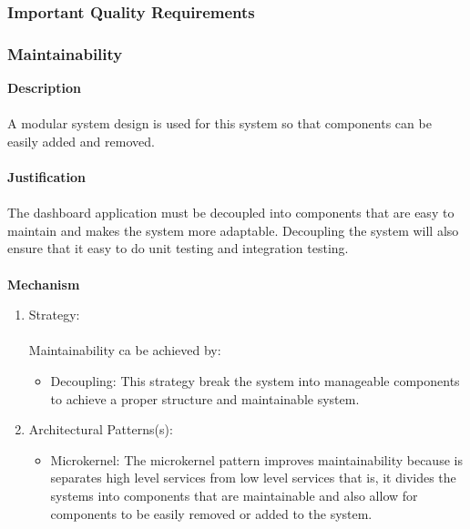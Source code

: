 \documentclass[hidelinks, 12pt, oneside]{article}
\begin{document}
		\subsubsection{Important Quality Requirements}
			\subsubsection*{Maintainability}
			\textbf{Description}\\\\
			A modular system design is used for this system so that components can be easily added and removed.\\\\
			\textbf{Justification}\\\\
			The dashboard application must be decoupled into components that are easy to maintain and makes the system more adaptable. Decoupling the system will also ensure that it easy to do unit testing and integration testing.\\\\
			\textbf{Mechanism}
			\begin{enumerate}
				\item Strategy:\\\\
				Maintainability ca be achieved by:
				\begin{itemize}
				\item Decoupling: This strategy break the system into manageable components to achieve a proper structure and maintainable system.  
				\end{itemize}
				\item Architectural Patterns(s):
				\begin{itemize}
				\item Microkernel: The microkernel pattern improves maintainability because is separates high level services  from low level services that is, it divides the systems into components that are maintainable and also allow for components to be easily removed or added to the system.
				\end{itemize}
			\end{enumerate}
			\newpage
\end{document}
